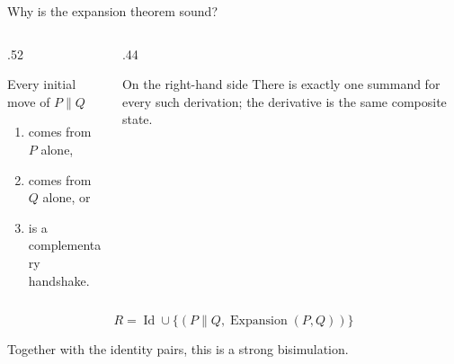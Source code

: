 \documentclass[handout,aspectratio=169,11pt]{beamer}
\newcommand{\Takeaway}[1]{\begin{exampleblock}{}#1\end{exampleblock}}
\begin{document}
\begin{frame}{Why is the expansion theorem sound?}
  \begin{columns}[T,onlytextwidth]
    \begin{column}{.52\textwidth}
      \begin{block}{Every initial move of $P\parallel Q$}
        \begin{enumerate}
          \item comes from $P$ alone,
          \item comes from $Q$ alone, or
          \item is a complementary handshake.
        \end{enumerate}
      \end{block}
    \end{column}
    \begin{column}{.44\textwidth}
      \begin{exampleblock}{On the right-hand side}
        There is exactly one summand for every such derivation; the derivative is the same composite state.
      \end{exampleblock}
    \end{column}
  \end{columns}
  \vspace{4mm}
  \[
    R=\operatorname{Id}\cup
      \{(P\parallel Q,\operatorname{Expansion}(P,Q))\}
  \]
  \Takeaway{Together with the identity pairs, this is a strong bisimulation.}
\end{frame}
\end{document}
